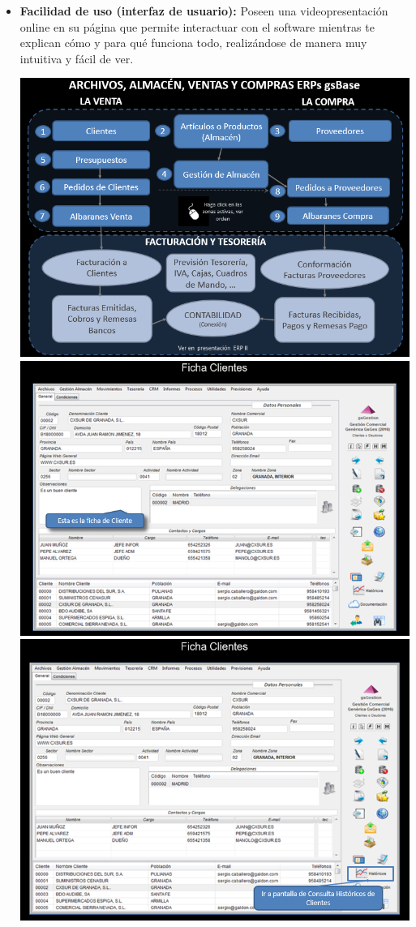 \documentclass{article}
\begin{document}
\begin{itemize}
	\item \textbf{Facilidad de uso (interfaz de usuario):} Poseen una videopresentación online en su página que permite interactuar con el software mientras te explican cómo y para qué funciona todo, realizándose de manera muy intuitiva y fácil de ver.

\begin{flushleft}
	\includegraphics[scale=0.65]{imagenes/CapturasoftwareSaaS1a.png} 
	\includegraphics[scale=0.65]{imagenes/CapturasoftwareSaaS1b.png}
	\includegraphics[scale=0.65]{imagenes/CapturasoftwareSaaS1c.png}

\end{flushleft}
\end{itemize}
\end{document}
